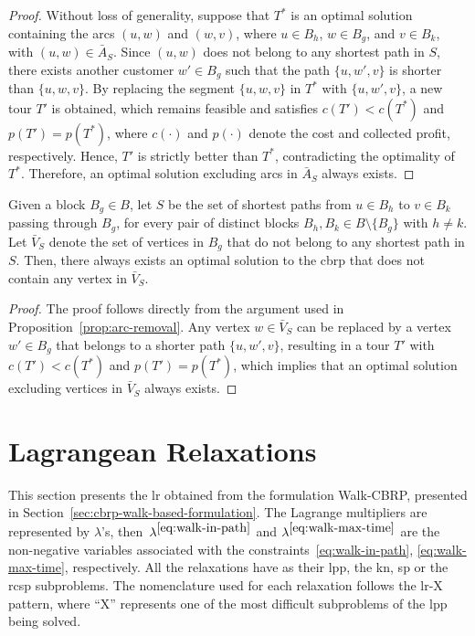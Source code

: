 \begin{proof}
	Without loss of generality, suppose that $T^*$ is an optimal solution containing the arcs $(u, w)$ and $(w, v)$, where $u \in B_h$, $w \in B_g$, and $v \in B_k$, with $(u, w) \in \bar{A}_S$.
	Since $(u, w)$ does not belong to any shortest path in $S$, there exists another customer $w' \in B_g$ such that the path $\{u, w', v\}$ is shorter than $\{u, w, v\}$.
	By replacing the segment $\{u, w, v\}$ in $T^*$ with $\{u, w', v\}$, a new tour $T'$ is obtained, which remains feasible and satisfies $c(T') < c(T^*)$ and $p(T') = p(T^*)$,
	where $c(\cdot)$ and $p(\cdot)$ denote the cost and collected profit, respectively.
	Hence, $T'$ is strictly better than $T^*$, contradicting the optimality of $T^*$.
	Therefore, an optimal solution excluding arcs in $\bar{A}_S$ always exists.
\end{proof}

\begin{proposition}
	\label{prop:vertex-removal}
	Given a block $B_g \in B$, let $S$ be the set of shortest paths from $u \in B_h$ to $v \in B_k$ passing through $B_g$,
	for every pair of distinct blocks $B_h, B_k \in B \setminus \{ B_g \}$ with $h \neq k$.
	Let $\bar{V}_S$ denote the set of vertices in $B_g$ that do not belong to any shortest path in $S$.
	Then, there always exists an optimal solution to the \gls{cbrp} that does not contain any vertex in $\bar{V}_S$.
\end{proposition}

\begin{proof}
	The proof follows directly from the argument used in Proposition~\ref{prop:arc-removal}.
	Any vertex $w \in \bar{V}_S$ can be replaced by a vertex $w' \in B_g$ that belongs to a shorter path $\{u, w', v\}$,
	resulting in a tour $T'$ with $c(T') < c(T^*)$ and $p(T') = p(T^*)$, which implies that an optimal solution excluding vertices in $\bar{V}_S$ always exists.
\end{proof}

\section{Lagrangean Relaxations}\label{sec:lagrangean-relaxations}

\newcommand{\mult}[2]{\ensuremath{\lambda^{#1}_{#2}}}
\newcommand{\lrsp}{\textit{LR-SP}}
\newcommand{\lrkn}{\textit{LR-KN}}
\newcommand{\lrcsp}{\textit{LR-RCSP}}
\newcommand{\lrcspkn}{\textit{LR-RCSP-KN}}

This section presents the \gls{lr} obtained from the formulation Walk-CBRP, presented in
Section~\ref{sec:cbrp-walk-based-formulation}.
The Lagrange multipliers are represented by $\lambda$'s,
then~\mult{\ref{eq:walk-in-path}}{} and
\mult{\ref{eq:walk-max-time}}{} are
the non-negative variables  associated with the constraints~\eqref{eq:walk-in-path},
\eqref{eq:walk-max-time}, respectively. All  the relaxations have as their
\gls{lpp}, the \gls{kn}, \gls{sp} or the \gls{rcsp} subproblems.
The nomenclature used for each relaxation  follows the \gls{lr}-X pattern, where ``X''
represents one of the most difficult subproblems of the \gls{lpp} being solved.

